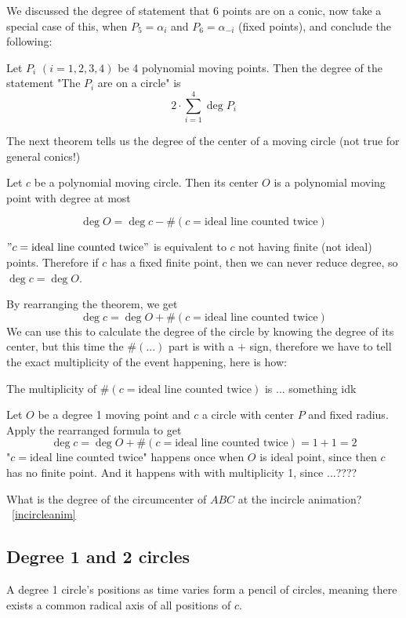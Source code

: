 \documentclass[a4paper]{article}
\begin{document}
We discussed the degree of statement that 6 points are on a conic, now take a special case of this, when $P_5=\alpha_i$ and $P_6=\alpha_{-i}$ (fixed points), and conclude the following:
\begin{theorem}
    Let $P_i$ $(i=1,2,3,4)$ be 4 polynomial moving points.
    Then the degree of the statement "The $P_i$ are on a circle" is 
    $$2\cdot \sum_{i=1}^4 \deg P_i$$
\end{theorem}

The next theorem tells us the degree of the center of a moving circle (not true for general conics!)

\begin{theorem}
    Let $c$ be a polynomial moving circle. Then its center $O$ is a polynomial moving point with degree at most

    $$\deg O=\deg c-\#(c=\text{ideal line counted twice})$$
\end{theorem}
\begin{example}
    $"c=\text{ideal line counted twice}"$ is equivalent to $c$ not having finite (not ideal) points. Therefore if $c$ has a fixed finite point, then we can never reduce degree, so $\deg c=\deg O$.
\end{example}

By rearranging the theorem, we get
$$\deg c=\deg O+ \#(c=\text{ideal line counted twice})$$
We can use this to calculate the degree of the circle by knowing the degree of its center, but this time the $\#(...)$ part is with a $+$ sign, therefore we have to tell the exact multiplicity of the event happening, here is how:
\begin{remark}
    The multiplicity of $\#(c=\text{ideal line counted twice})$ is ... something idk
\end{remark}
\begin{example}
    Let $O$ be a degree 1 moving point and $c$ a circle with center $P$ and fixed radius. Apply the rearranged formula to get
    $$\deg c=\deg O+ \#(c=\text{ideal line counted twice})=1+1=2$$
    "$c=\text{ideal line counted twice}$" happens once when $O$ is ideal point, since then $c$ has no finite point. And it happens with with multiplicity 1, since ...????
\end{example}
\begin{exercise}
    What is the degree of the circumcenter of $ABC$ at the incircle animation? ~\ref{incircleanim}
\end{exercise}

\subsection{Degree 1 and 2 circles}
\begin{lemma}
    A degree 1 circle's positions as time varies form a pencil of circles, meaning there exists a common radical axis of all positions of $c$.
\end{lemma}
\end{document}
